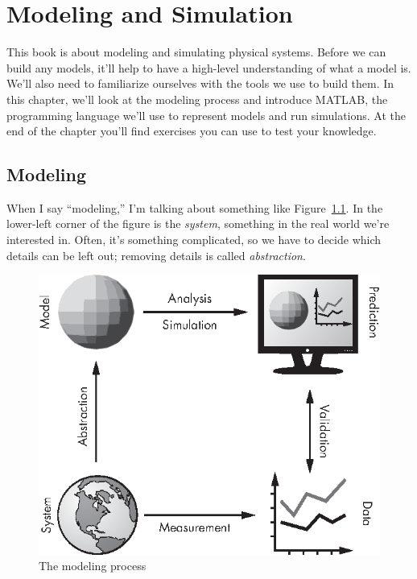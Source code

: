 \chapter{Modeling and Simulation}
\label{modeling}

This book is about modeling and simulating physical systems. Before we can build any models, it'll help to have a high-level understanding of what a model is. We'll also need to familiarize ourselves with the tools we use to build them. In this chapter, we'll look at the modeling process and introduce MATLAB, the programming language we'll use to represent models and run \mbox{simulations}. At the end of the chapter you'll find exercises you can use to test your knowledge.


\section{Modeling}

When I say ``modeling,'' I'm talking about something like Figure~\ref{fig:modeling}.
In the lower-left corner of the figure is the \emph{system}, something in the real world we're interested in.  Often, it's something complicated, so we have to decide which
details can be left out; removing details is called \emph{abstraction}.

\begin{figure}[h]
  \centerline{\includegraphics[scale=0.8]{images/figure01_01_new.eps}}
  \caption{The modeling process}
  \label{fig:modeling}
\end{figure}

